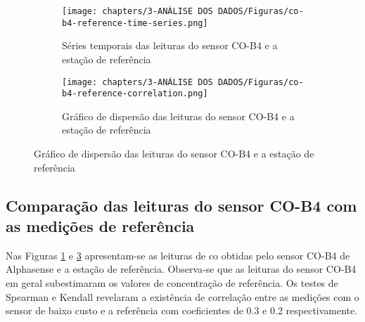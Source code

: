 \begin{figure}[h]
    \centering
    \caption{Séries temporais e gráficos de dispersão das medições de \acrshort{co}}
    \begin{subfigure}{0.45\textwidth}
        \texttt{[image: chapters/3-ANÁLISE DOS DADOS/Figuras/co-b4-reference-time-series.png]}
        \caption{Séries temporais das leituras do sensor CO-B4 e a estação de referência}
        \label{fig:data-co-reference-time-series}
    \end{subfigure}
    \hfill
    \begin{subfigure}{0.54\textwidth}
        \texttt{[image: chapters/3-ANÁLISE DOS DADOS/Figuras/co-b4-reference-correlation.png]}
        \caption{Gráfico de dispersão das leituras do sensor CO-B4 e a estação de referência}
        \label{fig:data-co-reference-corr}
    \end{subfigure}
\end{figure}

\subsection{Comparação das leituras do sensor CO-B4 com as medições de referência}

Nas Figuras \ref{fig:data-co-reference-time-series} e \ref{fig:data-co-reference-corr} apresentam-se as leituras de \acrshort{co} obtidas pelo sensor CO-B4 de Alphasense e a estação de referência. Observa-se que as leituras do sensor CO-B4 em geral subestimaram os valores de concentração de referência. Os testes de Spearman e Kendall revelaram a existência de correlação entre as medições com o sensor de baixo custo e a referência com coeficientes de 0.3 e 0.2 respectivamente.
